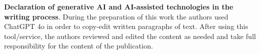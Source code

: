 \documentclass[12pt]{article}
\begin{document}
\newpage



\clearpage

\newpage
\appendix

\textbf{Declaration of generative AI and AI-assisted technologies in the writing process}. During the preparation of this work the authors used ChatGPT 4o in order to copy-edit written paragraphs of text. After using this tool/service, the authors reviewed and edited the content as needed and take full responsibility for the content of the publication.
\end{document}
